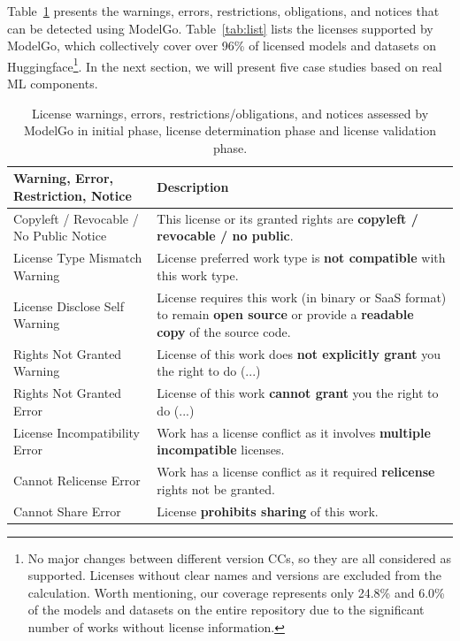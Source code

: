 Table~\ref{tab:analysis} presents the warnings, errors, restrictions, obligations, and notices that can be detected using ModelGo.
Table~\ref{tab:list} lists the licenses supported by ModelGo, which collectively cover over 96\% of licensed models and datasets on Huggingface\footnote{No major changes between different version CCs, so they are all considered as supported. Licenses without clear names and versions are excluded from the calculation. Worth mentioning, our coverage represents only 24.8\% and 6.0\% of the models and datasets on the entire repository due to the significant number of works without license information.}.
In the next section, we will present five case studies based on real ML components.


\begin{table}[t]
    \caption{License warnings, errors, restrictions/obligations, and notices assessed by ModelGo in \textcolor{Permissive}{initial phase}, \textcolor{Copyleft}{license determination phase} and license validation phase.}
    \vspace{-3mm}
    \scriptsize
    \label{tab:analysis}
    \begin{tabular}{|p{3.3cm}|p{4.3cm}|}

    \hline
    \rowcolor[gray]{.8}
    \textbf{Warning, Error, Restriction, Notice} & \textbf{Description} \\ \hline
    
    \textcolor{Permissive}{Copyleft / Revocable / No Public Notice} & This license or its granted rights are \textbf{copyleft / revocable / no public}. \\ \hline \hline
    
    \textcolor{Permissive}{License Type Mismatch Warning} & License preferred work type is \textbf{not compatible} with this work type. \\ \hline
    License Disclose Self Warning & License requires this work (in binary or SaaS format) to remain \textbf{open source} or provide a \textbf{readable copy} of the source code. \\ \hline
    Rights Not Granted Warning & License of this work does \textbf{not explicitly grant} you the right to do (...) \\ \hline \hline
    
    
    Rights Not Granted Error & License of this work \textbf{cannot grant} you the right to do (...) \\ \hline
    \textcolor{Copyleft}{License Incompatibility Error} & Work has a license conflict as it involves \textbf{multiple incompatible} licenses. \\ \hline
    \textcolor{Copyleft}{Cannot Relicense Error} & Work has a license conflict as it required \textbf{relicense} rights not be granted. \\ \hline
    Cannot Share Error & License \textbf{prohibits sharing} of this work. \\ \hline \hline


\end{tabular}
\end{table}

